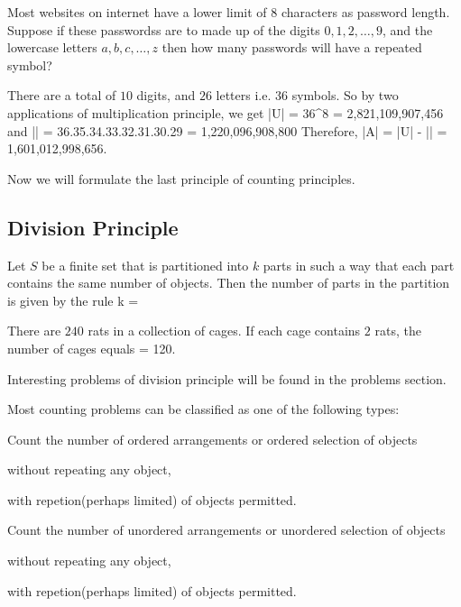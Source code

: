  Most websites on internet have a lower limit of $8$ characters as password length. Suppose if these
passwordss are to made up of the digits $0, 1, 2, \ldots, 9$, and the lowercase letters $a, b, c, \ldots, z$ then how many passwords
will have a repeated symbol?

There are a total of $10$ digits, and $26$ letters i.e. 36 symbols. So by two applications of multiplication principle, we get
\startformula |U| = 36^8 = 2,821,109,907,456\stopformula
and
\startformula || = 36.35.34.33.32.31.30.29 = 1,220,096,908,800\stopformula
Therefore,
\startformula |A| = |U| - || = 1,601,012,998,656.\stopformula

Now we will formulate the last principle of counting principles.

\subsection{Division Principle}
Let $S$ be a finite set that is partitioned into $k$ parts in such a way that each part contains the same number of objects. Then
the number of parts in the partition is given by the rule
\startformula k = \stopformula

 There are $240$ rats in a collection of cages. If each cage contains $2$ rats, the number of cages
equals \startformula {} = 120.\stopformula

Interesting problems of division principle will be found in the problems section.

Most counting problems can be classified as one of the following types:

\startitemize[n]
\item Count the number of ordered arrangements or ordered selection of objects
  \startitemize[i]
  \item without repeating any object,
  \item with repetion(perhaps limited) of objects permitted.
  \stopitemize
\item Count the number of unordered arrangements or unordered selection of objects
  \startitemize[i]
    \item without repeating any object,
  \item with repetion(perhaps limited) of objects permitted.
  \stopitemize
\stopitemize

